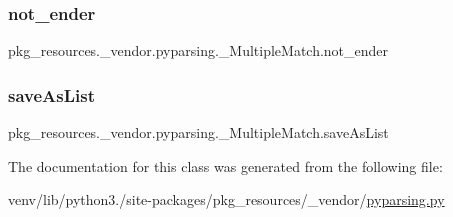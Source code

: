 \subsubsection{\texorpdfstring{not\+\_\+ender}{not\_ender}}
{\footnotesize\ttfamily pkg\+\_\+resources.\+\_\+vendor.\+pyparsing.\+\_\+\+Multiple\+Match.\+not\+\_\+ender}

\mbox{\label{classpkg__resources_1_1__vendor_1_1pyparsing_1_1__MultipleMatch_ae775fc868bff417f72a535445862ebdf}} 
\subsubsection{\texorpdfstring{save\+As\+List}{saveAsList}}
{\footnotesize\ttfamily pkg\+\_\+resources.\+\_\+vendor.\+pyparsing.\+\_\+\+Multiple\+Match.\+save\+As\+List}



The documentation for this class was generated from the following file\+:\begin{DoxyCompactItemize}
\item 
venv/lib/python3./site-\/packages/pkg\+\_\+resources/\+\_\+vendor/\hyperlink{pkg__resources_2__vendor_2pyparsing_8py}{pyparsing.\+py}\end{DoxyCompactItemize}
